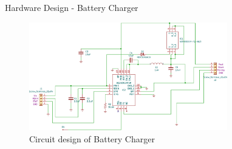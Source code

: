 \documentclass[aspectratio=169]{beamer}
\begin{document}
\begin{frame}{Hardware Design - Battery Charger }
	\begin{figure}[h]
		\centering
		\includegraphics[width=0.77\textwidth]{diag/charg.pdf}
		\caption{Circuit design of Battery Charger}
		\label{fig:mesh1}
	\end{figure}
\end{frame}
\end{document}
